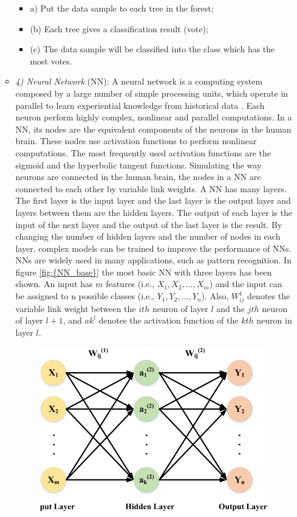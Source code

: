 \begin{itemize}
\begin{itemize}
\begin{itemize}
\item[]a) Put the data sample to each tree in the forest;
\item[](b) Each tree gives a classification result (vote);
\item[](c) The data sample will be classified into the class which has the most votes.
\end{itemize}
\item[]\textit{4) Neural Network} (NN): A neural network is a computing system composed by a large number of simple processing units, which operate in parallel to learn experiential knowledge from historical data \cite{Haykin}. Each neuron perform highly complex, nonlinear and parallel computations. In a NN, its nodes are the equivalent components of the neurons in the human brain. These nodes use activation functions to perform nonlinear computations. The most frequently used activation functions are the sigmoid and the hyperbolic tangent functions. Simulating the way neurons are connected in the human brain, the nodes in a NN are connected to each other by variable link weights.
A NN has many layers. The first layer is the input layer and the last layer is the output layer and layers between them are the hidden layers. The output of each layer is the input of the next layer and the output of the last layer is the result. By changing the number of hidden layers and the number of nodes in each layer, complex models can be trained to improve the performance of NNs. NNs are widely used in many applications, such as pattern recognition. In figure \ref{fig:{NN_base}} the most basic NN with three layers has been shown. An input has $m$ features (i.e., $X_{1},X_{2},...,X_{m}$) and the input can be assigned to n possible classes (i.e., $Y_{1},Y_{2},...,Y_{n}$). Also, $W_{ij}^{1}$ denotes the variable link weight between the $ith$ neuron of layer $l$ and the $jth$ neuron of layer $l + 1$, and $ak^{l}$ denotes the activation function of the $kth$ neuron in layer $l$.
\begin{figure}[tb!]
	\centering
	\includegraphics[width=13cm]{figure/NN_base.png}

\end{figure}
\end{itemize}
\end{itemize}
